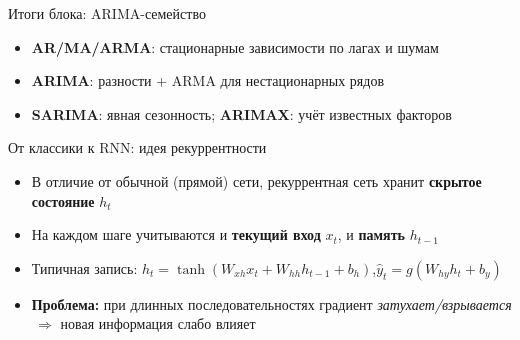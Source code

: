 \documentclass[aspectratio=1610,12pt]{beamer}
\begin{document}
\begin{frame}{Итоги блока: ARIMA-семейство}
\begin{itemize}
  \item \textbf{AR/MA/ARMA}: стационарные зависимости по лагах и шумам
  \item \textbf{ARIMA}: разности + ARMA для нестационарных рядов
  \item \textbf{SARIMA}: явная сезонность; \textbf{ARIMAX}: учёт известных факторов
\end{itemize}
\end{frame}


\begin{frame}{От классики к RNN: идея рекуррентности}
\begin{itemize}
  \item В отличие от обычной (прямой) сети, рекуррентная сеть хранит \textbf{скрытое состояние} $h_t$
  \item На каждом шаге учитываются и \textbf{текущий вход} $x_t$, и \textbf{память} $h_{t-1}$
  \item Типичная запись: \;$h_t=\tanh(W_{xh}x_t+W_{hh}h_{t-1}+b_h)$,\quad $\hat y_t=g(W_{hy}h_t+b_y)$
  \item \textbf{Проблема:} при длинных последовательностях градиент \textit{затухает/взрывается} \,$\Rightarrow$ новая информация слабо влияет
\end{itemize}
\end{frame}
\end{document}

